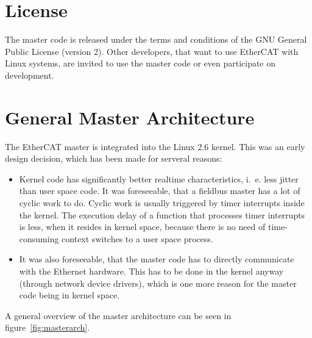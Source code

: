 \documentclass[a4paper,12pt,BCOR6mm,bibtotoc,idxtotoc]{scrbook}
\begin{document}

\section{License}
\label{sec:license}

The master code is released under the terms and conditions of the GNU
General Public License \cite{gpl} (version 2). Other
developers, that want to use EtherCAT with Linux systems, are invited
to use the master code or even participate on development.


\section{General Master Architecture}
\label{sec:masterarch}

The EtherCAT master is integrated into the Linux 2.6 kernel. This was
an early design decision, which has been made for serveral reasons:

\begin{itemize}
\item Kernel code has significantly better realtime characteristics,
  i.~e. less jitter than user space code. It was foreseeable, that a
  fieldbus master has a lot of cyclic work to do. Cyclic work is
  usually triggered by timer interrupts inside the kernel. The
  execution delay of a function that processes timer interrupts is
  less, when it resides in kernel space, because there is no need of
  time-consuming context switches to a user space process.
\item It was also foreseeable, that the master code has to directly
  communicate with the Ethernet hardware. This has to be done in the
  kernel anyway (through network device drivers), which is one more
  reason for the master code being in kernel space.
\end{itemize}

A general overview of the master architecture can be seen in
figure~\ref{fig:masterarch}.
\end{document}
